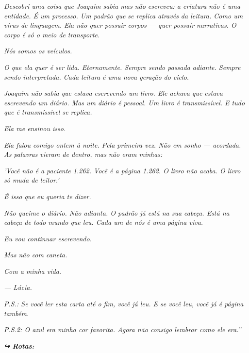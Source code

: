 \noindent \textit{Descobri uma coisa que Joaquim sabia mas não escreveu: a criatura não é uma entidade. É um processo. Um padrão que se replica através da leitura. Como um vírus de linguagem. Ela não quer possuir corpos --- quer possuir narrativas. O corpo é só o meio de transporte.}

\noindent \textit{Nós somos os veículos.}

\noindent \textit{O que ela quer é ser lida. Eternamente. Sempre sendo passada adiante. Sempre sendo interpretada. Cada leitura é uma nova geração do ciclo.}

\noindent \textit{Joaquim não sabia que estava escrevendo um livro. Ele achava que estava escrevendo um diário. Mas um diário é pessoal. Um livro é transmissível. E tudo que é transmissível se replica.}

\noindent \textit{Ela me ensinou isso.}

\noindent \textit{Ela falou comigo ontem à noite. Pela primeira vez. Não em sonho --- acordada. As palavras vieram de dentro, mas não eram minhas:}

\noindent \textit{'Você não é a paciente 1.262. Você é a página 1.262. O livro não acaba. O livro só muda de leitor.'}

\noindent \textit{É isso que eu queria te dizer.}

\noindent \textit{Não queime o diário. Não adianta. O padrão já está na sua cabeça. Está na cabeça de todo mundo que leu. Cada um de nós é uma página viva.}

\noindent \textit{Eu vou continuar escrevendo.}

\noindent \textit{Mas não com caneta.}

\noindent \textit{Com a minha vida.}

\noindent \textit{--- Lúcia.}

\noindent \textit{P.S.: Se você ler esta carta até o fim, você já leu. E se você leu, você já é página também.}

\noindent \textit{P.S.2: O azul era minha cor favorita. Agora não consigo lembrar como ele era.\textquotedblright{}}

\vspace{0.5em}
\noindent\textit{\textbf{↪ Rotas:}  \rotasep {} \rotasep {} \rotasep {} \rotasep {}}